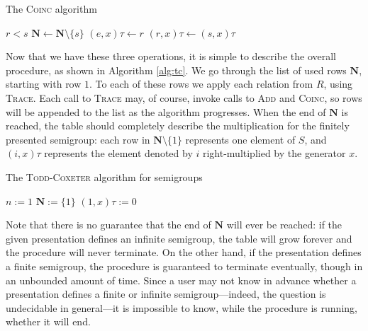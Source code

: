 \begin{algorithm}
\caption{The \textsc{Coinc} algorithm}
\label{alg:coinc}
\begin{algorithmic}[1]
\Require $r < s$
\State $\mathbf{N} \gets \mathbf{N} \setminus \{s\}$
      \State $(e, x)\tau \gets r$
    \EndIf
  \EndFor
\EndFor
{}
    \State $(r, x)\tau \gets (s, x)\tau$
    \State {}
  \EndIf
\EndFor
\EndProcedure
\end{algorithmic}
\end{algorithm}

Now that we have these three operations, it is simple to describe the overall
procedure, as shown in Algorithm \ref{alg:tc}.  We go through the list of used
rows $\mathbf{N}$, starting with row $1$.  To each
of these rows we apply each relation from $R$, using \textsc{Trace}.  Each call
to \textsc{Trace} may, of course, invoke calls to \textsc{Add} and
\textsc{Coinc}, so rows will be appended to the list as the algorithm
progresses.  When the end of $\mathbf{N}$ is reached, the table should
completely describe the multiplication for the finitely presented semigroup:
each row in $\mathbf{N} \setminus \{1\}$ represents one element of $S$, and
$(i, x)\tau$ represents the element denoted by $i$ right-multiplied by the
generator $x$.

\begin{algorithm}
\caption{The \textsc{Todd-Coxeter} algorithm for semigroups}
\label{alg:tc}
\begin{algorithmic}[1]
\State $n := 1$
\State $\mathbf{N} := \{1\}$
  \State $(1, x)\tau := 0$
\EndFor
{}
    \State {}
  \EndFor
\EndFor
\EndProcedure
\end{algorithmic}
\end{algorithm}

Note that there is no guarantee that the end of $\mathbf{N}$ will ever be
reached: if the given presentation defines an infinite semigroup, the table will
grow forever and the procedure will never terminate.  On the other hand, if the
presentation defines a finite semigroup, the procedure is guaranteed to
terminate eventually, though in an unbounded amount of time.  Since a user may
not know in advance whether a presentation defines a finite or infinite
semigroup---indeed, the question is undecidable in general---it is impossible to
know, while the procedure is running, whether it will end.

